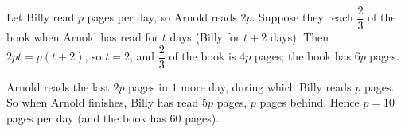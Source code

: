 Let Billy read $p$ pages per day, so Arnold reads $2p$. Suppose they reach $\dfrac23$ of the book when Arnold has read for $t$ days (Billy for $t+2$ days). Then $2pt=p(t+2)$, so $t=2$, and $\dfrac23$ of the book is $4p$ pages; the book has $6p$ pages.

Arnold reads the last $2p$ pages in $1$ more day, during which Billy reads $p$ pages. So when Arnold finishes, Billy has read $5p$ pages, $p$ pages behind. Hence $p=\boxed{10}$ pages per day (and the book has $60$ pages).
